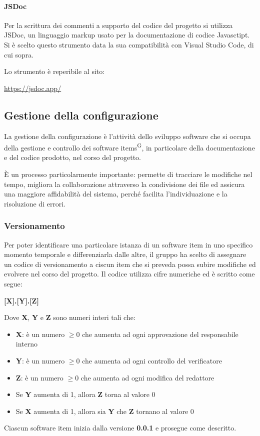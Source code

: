 \paragraph{JSDoc}
Per la scrittura dei commenti a supporto del codice del progetto si utilizza JSDoc, un linguaggio markup usato per la documentazione di codice Javasctipt. Si è scelto questo strumento data la sua compatibilità con Visual Studio Code, di cui sopra.
\par Lo strumento è reperibile al sito:
\begin{center}
    \url{https://jsdoc.app/}
\end{center}



\subsection{Gestione della configurazione}\label{sec:processi_di_supporto:gestione_configurazione}
La gestione della configurazione è l'attività dello sviluppo software che si occupa della gestione e controllo dei software items\textsuperscript{G}, in particolare della documentazione e del codice prodotto, nel corso del progetto.
\par È un processo particolarmente importante: permette di tracciare le modifiche nel tempo, migliora la collaborazione attraverso la condivisione dei file ed assicura una maggiore affidabilità del sistema, perché facilita l'individuazione e la risoluzione di errori.
\subsubsection{Versionamento}
Per poter identificare una particolare istanza di un software item in uno specifico momento temporale e differenziarla dalle altre, il gruppo ha scelto di assegnare un codice di versionamento a ciscun item che si preveda possa subire modifiche ed evolvere nel corso del progetto. Il codice utilizza cifre numeriche ed è scritto come segue:
\begin{center}
    \textbf{[X].[Y].[Z]}
\end{center}
Dove \textbf{X}, \textbf{Y} e \textbf{Z} sono numeri interi tali che:
\begin{itemize}
    \item \textbf{X}: è un numero $ \geq 0 $ che aumenta ad ogni approvazione del responsabile interno
    \item \textbf{Y}: è un numero $ \geq 0 $ che aumenta ad ogni controllo del verificatore
    \item \textbf{Z}: è un numero $ \geq 0 $ che aumenta ad ogni modifica del redattore
    \item Se \textbf{Y} aumenta di 1, allora \textbf{Z} torna al valore 0
    \item Se \textbf{X} aumenta di 1, allora sia \textbf{Y} che \textbf{Z} tornano al valore 0
\end{itemize}
Ciascun software item inizia dalla versione \textbf{0.0.1} e prosegue come descritto.
